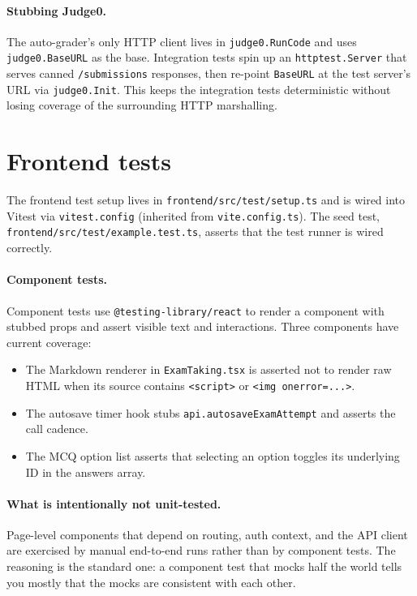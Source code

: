 \paragraph{Stubbing Judge0.} The auto-grader's only HTTP client lives in \texttt{judge0.RunCode} and uses \texttt{judge0.BaseURL} as the base. Integration tests spin up an \texttt{httptest.Server} that serves canned \texttt{/submissions} responses, then re-point \texttt{BaseURL} at the test server's URL via \texttt{judge0.Init}. This keeps the integration tests deterministic without losing coverage of the surrounding HTTP marshalling.

\section{Frontend tests}

The frontend test setup lives in \texttt{frontend/src/test/setup.ts} and is wired into Vitest via \texttt{vitest.config} (inherited from \texttt{vite.config.ts}). The seed test, \texttt{frontend/src/test/example.test.ts}, asserts that the test runner is wired correctly.

\paragraph{Component tests.} Component tests use \texttt{@testing-library/react} to render a component with stubbed props and assert visible text and interactions. Three components have current coverage:

\begin{itemize}
  \item The Markdown renderer in \texttt{ExamTaking.tsx} is asserted not to render raw HTML when its source contains \texttt{<script>} or \texttt{<img onerror=...>}.
  \item The autosave timer hook stubs \texttt{api.autosaveExamAttempt} and asserts the call cadence.
  \item The MCQ option list asserts that selecting an option toggles its underlying ID in the answers array.
\end{itemize}

\paragraph{What is intentionally not unit-tested.} Page-level components that depend on routing, auth context, and the API client are exercised by manual end-to-end runs rather than by component tests. The reasoning is the standard one: a component test that mocks half the world tells you mostly that the mocks are consistent with each other.

